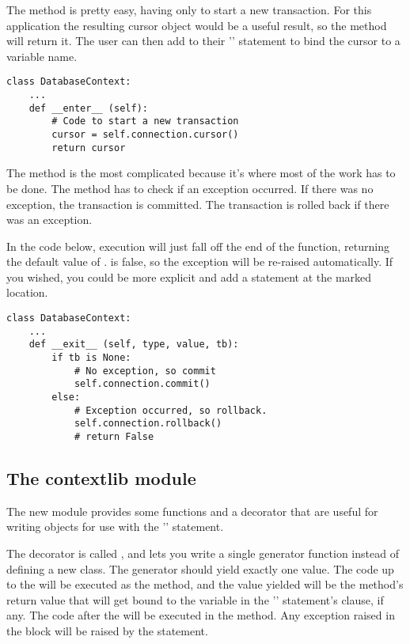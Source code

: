 \documentclass{howto}
\begin{document}
The  method is pretty easy, having only to start
a new transaction.  For this application the resulting cursor object
would be a useful result, so the method will return it.  The user can
then add  to their '' statement to bind
the cursor to a variable name.

\begin{verbatim}
class DatabaseContext:
    ...
    def __enter__ (self):
        # Code to start a new transaction
        cursor = self.connection.cursor()
        return cursor
\end{verbatim}

The  method is the most complicated because it's
where most of the work has to be done.  The method has to check if an
exception occurred.  If there was no exception, the transaction is
committed.  The transaction is rolled back if there was an exception.

In the code below, execution will just fall off the end of the
function, returning the default value of .   is
false, so the exception will be re-raised automatically.  If you
wished, you could be more explicit and add a 
statement at the marked location.

\begin{verbatim}
class DatabaseContext:
    ...
    def __exit__ (self, type, value, tb):
        if tb is None:
            # No exception, so commit
            self.connection.commit()
        else:
            # Exception occurred, so rollback.
            self.connection.rollback()
            # return False
\end{verbatim}


\subsection{The contextlib module\label{module-contextlib}}

The new  module provides some functions and a
decorator that are useful for writing objects for use with the
'' statement.

The decorator is called , and lets you write
a single generator function instead of defining a new class.  The generator
should yield exactly one value.  The code up to the 
will be executed as the  method, and the value
yielded will be the method's return value that will get bound to the
variable in the '' statement's  clause, if
any.  The code after the  will be executed in the
 method.  Any exception raised in the block will be
raised by the  statement.
\end{document}
